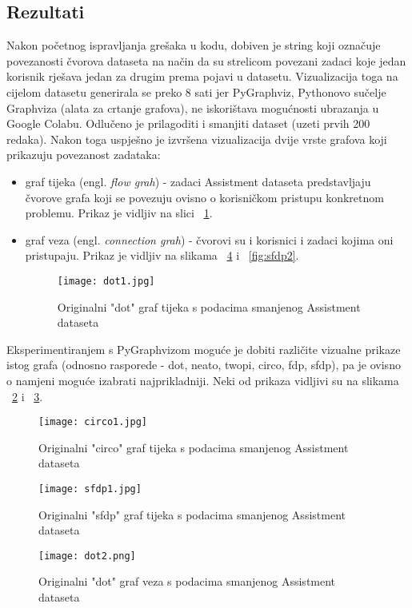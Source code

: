 \subsection{Rezultati}
Nakon početnog ispravljanja grešaka u kodu, dobiven je string koji označuje povezanosti čvorova dataseta na način da su strelicom povezani zadaci koje jedan korisnik rješava jedan za drugim prema pojavi u datasetu. Vizualizacija toga na cijelom datasetu generirala se preko 8 sati jer PyGraphviz, Pythonovo sučelje Graphviza (alata za crtanje grafova), ne iskorištava mogućnosti ubrazanja u Google Colabu. Odlučeno je prilagoditi i smanjiti dataset (uzeti prvih 200 redaka). Nakon toga uspješno je izvršena vizualizacija dvije vrste grafova koji prikazuju povezanost zadataka:
\begin{itemize}
\item graf tijeka (engl. \textit{flow grah}) - zadaci Assistment dataseta predstavljaju čvorove grafa koji se povezuju ovisno o korisničkom pristupu konkretnom problemu. Prikaz je vidljiv na slici ~\ref{fig:dot1}.
\item graf veza (engl. \textit{connection grah}) - čvorovi su i korisnici i zadaci kojima oni pristupaju. Prikaz je vidljiv na slikama ~\ref{fig:dot2} i ~\ref{fig:sfdp2}.
\begin{figure}[!htb]
\centering
\texttt{[image: dot1.jpg]}
\caption{Originalni "dot" graf tijeka s podacima smanjenog Assistment dataseta}
\label{fig:dot1}
\end{figure}
\end{itemize}

\noindent Eksperimentiranjem s PyGraphvizom moguće je dobiti različite vizualne prikaze istog grafa (odnosno rasporede - dot, neato, twopi, circo, fdp, sfdp), pa je ovisno o namjeni moguće izabrati najprikladniji. Neki od prikaza vidljivi su na slikama ~\ref{fig:circo1} i ~\ref{fig:sfdp1}.

\begin{figure}[!htb]
\centering
\texttt{[image: circo1.jpg]}
\caption{Originalni "circo" graf tijeka s podacima smanjenog Assistment dataseta}
\label{fig:circo1}
\end{figure}

\begin{figure}[!htb]
\centering
\texttt{[image: sfdp1.jpg]}
\caption{Originalni "sfdp" graf tijeka s podacima smanjenog Assistment dataseta}
\label{fig:sfdp1}
\end{figure}

\begin{figure}[!htb]
\centering
\texttt{[image: dot2.png]}
\caption{Originalni "dot" graf veza s podacima smanjenog Assistment dataseta}
\label{fig:dot2}
\end{figure}

